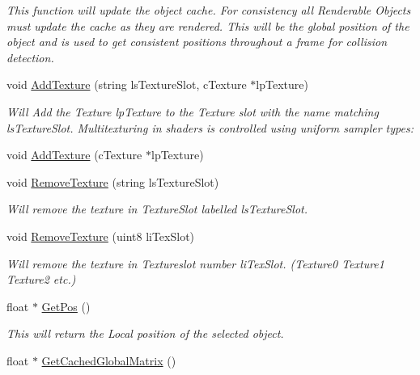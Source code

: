 \begin{DoxyCompactItemize}
\begin{DoxyCompactList}\small\item\em This function will update the object cache. For consistency all Renderable Objects must update the cache as they are rendered. This will be the global position of the object and is used to get consistent positions throughout a frame for collision detection. \end{DoxyCompactList}\item 
void \hyperlink{classc_render_object_ae6383e70912480e39209e5ed6297380c}{AddTexture} (string lsTextureSlot, cTexture $\ast$lpTexture)
\begin{DoxyCompactList}\small\item\em Will Add the Texture lpTexture to the Texture slot with the name matching lsTextureSlot. Multitexturing in shaders is controlled using uniform sampler types: \end{DoxyCompactList}\item 
void \hyperlink{classc_render_object_ad45b379f57731d803f7a52e58d91d3aa}{AddTexture} (cTexture $\ast$lpTexture)
\item 
\hypertarget{classc_render_object_a6e353a1713c4c6c46922a42e950f0d5a}{
void \hyperlink{classc_render_object_a6e353a1713c4c6c46922a42e950f0d5a}{RemoveTexture} (string lsTextureSlot)}
\label{classc_render_object_a6e353a1713c4c6c46922a42e950f0d5a}

\begin{DoxyCompactList}\small\item\em Will remove the texture in TextureSlot labelled lsTextureSlot. \end{DoxyCompactList}\item 
\hypertarget{classc_render_object_afd3f36d943e2438f52afb11133a526ca}{
void \hyperlink{classc_render_object_afd3f36d943e2438f52afb11133a526ca}{RemoveTexture} (uint8 liTexSlot)}
\label{classc_render_object_afd3f36d943e2438f52afb11133a526ca}

\begin{DoxyCompactList}\small\item\em Will remove the texture in Textureslot number liTexSlot. (Texture0 Texture1 Texture2 etc.) \end{DoxyCompactList}\item 
\hypertarget{classc_render_object_aed36706b1114b4ed11f2e5d8e8dd3ace}{
float $\ast$ \hyperlink{classc_render_object_aed36706b1114b4ed11f2e5d8e8dd3ace}{GetPos} ()}
\label{classc_render_object_aed36706b1114b4ed11f2e5d8e8dd3ace}

\begin{DoxyCompactList}\small\item\em This will return the Local position of the selected object. \end{DoxyCompactList}\item 
\hypertarget{classc_render_object_a7b3312f28505306fa8610d9e097f7b0e}{
float $\ast$ \hyperlink{classc_render_object_a7b3312f28505306fa8610d9e097f7b0e}{GetCachedGlobalMatrix} ()}
\label{classc_render_object_a7b3312f28505306fa8610d9e097f7b0e}


\end{DoxyCompactItemize}
